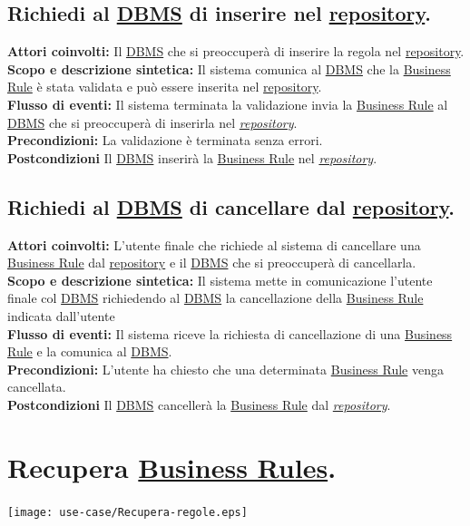 \subsection{Richiedi al \underline{DBMS}  di inserire nel \underline{repository}.}
\textbf{Attori coinvolti:} Il \underline{DBMS} che si preoccuper\`a di inserire la regola nel \underline{repository}.\\
\textbf{Scopo e descrizione sintetica:} Il sistema comunica al \underline{DBMS} che la \underline{Business Rule} \`e stata validata e pu\`o essere inserita nel \underline{repository}.\\
\textbf{Flusso di eventi:} Il sistema  terminata la validazione invia la \underline{Business Rule} al \underline{DBMS} che si preoccuper\`a di inserirla nel \textit{\underline{repository}}.\\
\textbf{Precondizioni:} La validazione \`e terminata senza errori.\\
\textbf{Postcondizioni} Il \underline{DBMS} inserir\`a la \underline{Business Rule} nel \textit{\underline{repository}}.

\subsection{Richiedi al \underline{DBMS}  di cancellare dal \underline{repository}.}
\textbf{Attori coinvolti:} L'utente finale che richiede al sistema di cancellare una \underline{Business Rule} dal \underline{repository} e il \underline{DBMS} che si preoccuper\`a di cancellarla.\\
\textbf{Scopo e descrizione sintetica:} Il sistema mette in comunicazione l'utente finale col \underline{DBMS} richiedendo al \underline{DBMS} la cancellazione della \underline{Business Rule} indicata dall'utente\\
\textbf{Flusso di eventi:} Il sistema riceve la richiesta di cancellazione di una \underline{Business Rule} e la comunica al \underline{DBMS}.\\
\textbf{Precondizioni:} L'utente ha chiesto che una determinata \underline{Business Rule} venga cancellata.\\
\textbf{Postcondizioni} Il \underline{DBMS} canceller\`a la \underline{Business Rule} dal \textit{\underline{repository}}.


\section{Recupera \underline{Business Rules}.}
\begin{center}
 \texttt{[image: use-case/Recupera-regole.eps]}\
\end{center}

